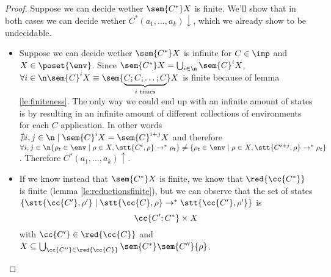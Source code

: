 \begin{proof}
  Suppose we can decide wether \(\sem{C^*}X\) is finite. We'll show
  that in both cases we can decide wether \(C^*(a_1, \dots,
  a_k)\downarrow\), which we already show to be undecidable.
  \begin{itemize}
  \item Suppose we can decide wether \(\sem{C^*}X\) is infinite for
    \(C\in\imp\) and \(X\in\poset{\env}\). Since \(\sem{C^*}X =
    \bigcup_{i\in\n}\sem{C}^i X\), \(\forall i \in \n \sem{C}^i X
    \equiv \sem{\underbrace{C;C;\dots;C}_{i\text{ times}}}X\) is
    finite because of lemma \ref{le:finiteness}. The only way we could
    end up with an infinite amount of states is by resulting in an
    infinite amount of different collections of environments for each
    \(C\) application. In other words \(\nexists i,j \in \n \mid
    \sem{C}^i X = \sem{C}^{i+j}X\) and therefore \(\forall i,j\in\n
    \{\rho_t \in \env \mid \rho \in X , \stt{C^i, \rho} \to^* \rho_t\}
    \neq \{\rho_t \in \env \mid \rho \in X , \stt{C^{i+j}, \rho} \to^*
    \rho_t\}\). Therefore \(C^*(a_1, \dots, a_k)\uparrow\).
  \item If we know instead that \(\sem{C^*}X\) is finite, we know that
    \(\red{\cc{C^*}}\) is finite (lemma \ref{le:reductionsfinite}),
    but we can observe that the set of states \(\{\stt{\cc{C'}, \rho'}
    \mid \stt{\cc{C}, \rho} \to^* \stt{\cc{C'}, \rho'}\}\) 
    is \[\cc{C';C^*} \times X\] with \(\cc{C'}\in\red{\cc{C}}\) and
    \(X \subseteq \bigcup_{\cc{C''}\in\red{\cc{C}}} \sem{C^*}
    \sem{C''} \{\rho\}\).
  \end{itemize}
\end{proof}
